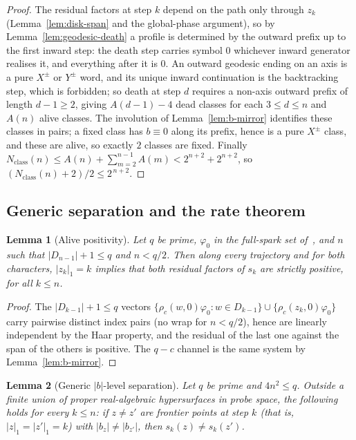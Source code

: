 \documentclass[11pt]{article}
\newtheorem{lemma}{Lemma}
\newcommand{\Nclass}{N_{\mathrm{class}}}
\begin{document}
\begin{proof}
The residual factors at step $k$ depend on the path only through $z_k$ (Lemma~\ref{lem:disk-span} and the
global-phase argument), so by Lemma~\ref{lem:geodesic-death} a profile is determined by the outward prefix
up to the first inward step: the death step carries symbol $0$ whichever inward generator realises it, and
everything after it is $0$.
An outward geodesic ending on an axis is a pure $X^{\pm}$ or $Y^{\pm}$ word, and its unique inward
continuation is the backtracking step, which is forbidden; so death at step $d$ requires a non-axis outward
prefix of length $d-1\ge2$, giving $A(d-1)-4$ dead classes for each $3\le d\le n$ and $A(n)$ alive classes.
The involution of Lemma~\ref{lem:b-mirror} identifies these classes in pairs; a fixed class has $b\equiv0$
along its prefix, hence is a pure $X^{\pm}$ class, and these are alive, so exactly $2$ classes are fixed.
Finally $\Nclass(n)\le A(n)+\sum_{m=2}^{n-1}A(m)<2^{n+2}+2^{n+2}$, so
$(\Nclass(n)+2)/2\le2^{\,n+2}$.
\end{proof}

\subsection{Generic separation and the rate theorem}
\label{sec:v3-rate}

\begin{lemma}[Alive positivity]
\label{lem:alive-positivity}
Let $q$ be prime, $\varphi_0$ in the full-spark set of~\cite{Lawrence2005}, and $n$ such that
$|D_{n-1}|+1\le q$ and $n<q/2$.
Then along every trajectory and for both characters, $|z_k|_1=k$ implies that both residual factors of
$s_k$ are strictly positive, for all $k\le n$.
\end{lemma}

\begin{proof}
The $|D_{k-1}|+1\le q$ vectors $\{\rho_c(w,0)\varphi_0:w\in D_{k-1}\}\cup\{\rho_c(z_k,0)\varphi_0\}$ carry
pairwise distinct index pairs (no wrap for $n<q/2$), hence are linearly independent by the Haar property,
and the residual of the last one against the span of the others is positive.
The $q-c$ channel is the same system by Lemma~\ref{lem:b-mirror}.
\end{proof}

\begin{lemma}[Generic $|b|$-level separation]
\label{lem:b-level-separation}
Let $q$ be prime and $4n^2\le q$.
Outside a finite union of proper real-algebraic hypersurfaces in probe space, the following holds for every
$k\le n$: if $z\neq z'$ are frontier points at step $k$ (that is, $|z|_1=|z'|_1=k$) with
$|b_z|\neq|b_{z'}|$, then $s_k(z)\neq s_k(z')$.
\end{lemma}
\end{document}
